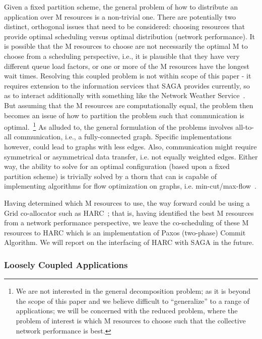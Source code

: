 \documentclass[conference,final]{IEEEtran}
\begin{document}
Given a fixed partition scheme, the general problem of how to
distribute an application over M resources is a non-trivial one.
There are potentially two distinct, orthogonal issues that need to be
considered: choosing resources that provide optimal scheduling versus
optimal distribution (network performance).  It is possible that the M
resources to choose are not necessarily the optimal M to choose from a
scheduling perspective, i.e., it is plausible that they have very
different queue load factors, or one or more of the M resources have
the longest wait times.  Resolving this coupled problem is not within
scope of this paper - it requires extension to the information
services that SAGA provides currently, so as to interact additionally
with something like the Network Weather
Service~\cite{wolski_cluster05, wolski_acm03, wolski_ccgrid02}.
But assuming that the M resources are
computationally equal, the problem then becomes an issue of how to
partition the problem such that communication is optimal.~\footnote{We
  are not interested in the general decomposition problem; as it is
  beyond the scope of this paper and we believe difficult to
  ``generalize'' to a range of applications; we will be concerned with
  the reduced problem, where the problem of interest is which M
  resources to choose such that the collective network performance is
  best.}  As alluded to, the general formulation of the problems
involves all-to-all communication, i.e., a fully-connected graph.
Specific implementations however, could lead to graphs with less
edges.  Also, communication might require symmetrical or asymmetrical
data transfer, i.e. not equally weighted edges.  Either way, the
ability to solve for an optimal configuration (based upon a fixed
partition scheme) is trivially solved by a thorn that can is capable
of implementing algorithms for flow optimization on graphs, i.e.
min-cut/max-flow~\cite{mincut-maxflow}.

Having determined which M resources to use, the way forward could be
using a Grid co-allocator such as HARC~\cite{harc_url}; that is,
having identified the best M resources from a network performance
perspective, we leave the co-scheduling of these M resources to HARC
which is an implementation of Paxos (two-phase) Commit Algorithm. We
will report on the interfacing of HARC with SAGA in the future.

\subsubsection{Loosely Coupled Applications}
\end{document}
